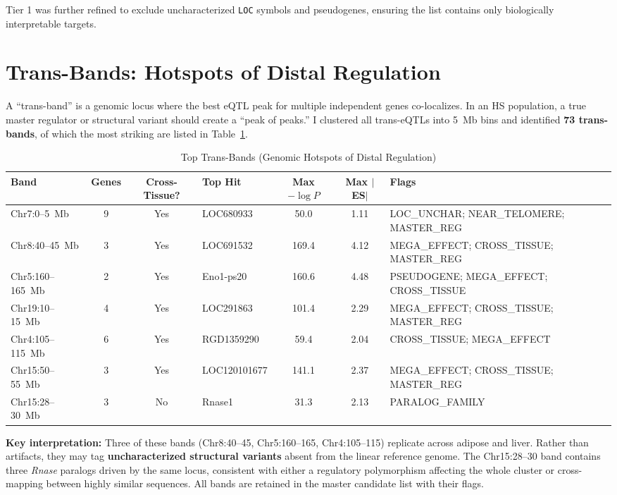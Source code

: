 \documentclass[11pt,a4paper]{article}
\begin{document}
\noindent Tier 1 was further refined to exclude uncharacterized \texttt{LOC} symbols and pseudogenes, ensuring the list contains only biologically interpretable targets.

\section{Trans-Bands: Hotspots of Distal Regulation} 

A ``trans-band'' is a genomic locus where the best eQTL peak for multiple independent genes co-localizes. In an HS population, a true master regulator or structural variant should create a ``peak of peaks.'' I clustered all trans-eQTLs into 5~Mb bins and identified \textbf{73 trans-bands}, of which the most striking are listed in Table~\ref{tab:transbands}.

\begin{table}[H]
\centering
\caption{Top Trans-Bands (Genomic Hotspots of Distal Regulation)}
\label{tab:transbands}
\small
\begin{tabular}{p{2.2cm}ccp{2cm}ccp{3.8cm}}
\toprule
\textbf{Band} & \textbf{Genes} & \textbf{Cross-Tissue?} & \textbf{Top Hit} & \textbf{Max $-\log P$} & \textbf{Max $|$ES$|$} & \textbf{Flags} \\
\midrule
Chr7:0--5~Mb & 9 & Yes & LOC680933 & 50.0 & 1.11 & LOC\_UNCHAR; NEAR\_TELOMERE; MASTER\_REG \\
Chr8:40--45~Mb & 3 & Yes & LOC691532 & 169.4 & 4.12 & MEGA\_EFFECT; CROSS\_TISSUE; MASTER\_REG \\
Chr5:160--165~Mb & 2 & Yes & Eno1-ps20 & 160.6 & 4.48 & PSEUDOGENE; MEGA\_EFFECT; CROSS\_TISSUE \\
Chr19:10--15~Mb & 4 & Yes & LOC291863 & 101.4 & 2.29 & MEGA\_EFFECT; CROSS\_TISSUE; MASTER\_REG \\
Chr4:105--115~Mb & 6 & Yes & RGD1359290 & 59.4 & 2.04 & CROSS\_TISSUE; MEGA\_EFFECT \\
Chr15:50--55~Mb & 3 & Yes & LOC120101677 & 141.1 & 2.37 & MEGA\_EFFECT; CROSS\_TISSUE; MASTER\_REG \\
Chr15:28--30~Mb & 3 & No & Rnase1 & 31.3 & 2.13 & PARALOG\_FAMILY \\
\bottomrule
\end{tabular}
\end{table}

\noindent\textbf{Key interpretation:} Three of these bands (Chr8:40--45, Chr5:160--165, Chr4:105--115) replicate across adipose and liver. Rather than artifacts, they may tag \textbf{uncharacterized structural variants} absent from the linear reference genome. The Chr15:28--30 band contains three \textit{Rnase} paralogs driven by the same locus, consistent with either a regulatory polymorphism affecting the whole cluster or cross-mapping between highly similar sequences. All bands are retained in the master candidate list with their flags.
\end{document}
